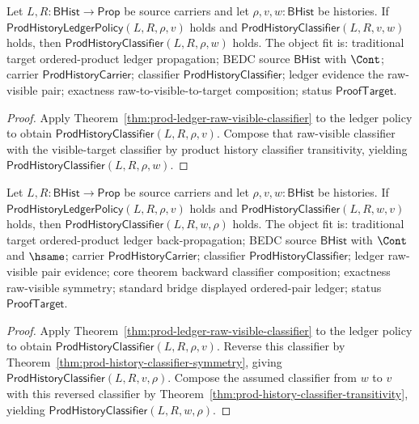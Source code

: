 \begin{theorem}
\label{thm:prod-ledger-classifier-extension}
Let $L,R:\mathsf{BHist}\to\mathsf{Prop}$ be source carriers and let
$\rho,v,w:\mathsf{BHist}$ be histories. If
$\mathsf{ProdHistoryLedgerPolicy}(L,R,\rho,v)$ holds and
$\mathsf{ProdHistoryClassifier}(L,R,v,w)$ holds, then
$\mathsf{ProdHistoryClassifier}(L,R,\rho,w)$ holds. The object fit is:
traditional target ordered-product ledger propagation; BEDC source
$\mathsf{BHist}$ with $\Cont$; carrier $\mathsf{ProdHistoryCarrier}$;
classifier $\mathsf{ProdHistoryClassifier}$; ledger evidence the raw-visible
pair; exactness raw-to-visible-to-target composition; status
$\mathsf{ProofTarget}$.
\end{theorem}
\begin{proof}
Apply Theorem~\ref{thm:prod-ledger-raw-visible-classifier} to the ledger
policy to obtain $\mathsf{ProdHistoryClassifier}(L,R,\rho,v)$. Compose that
raw-visible classifier with the visible-target classifier by product history
classifier transitivity, yielding
$\mathsf{ProdHistoryClassifier}(L,R,\rho,w)$.
\end{proof}

\begin{theorem}
\label{thm:prod-ledger-classifier-backward-composition}
Let $L,R:\mathsf{BHist}\to\mathsf{Prop}$ be source carriers and let
$\rho,v,w:\mathsf{BHist}$ be histories. If
$\mathsf{ProdHistoryLedgerPolicy}(L,R,\rho,v)$ holds and
$\mathsf{ProdHistoryClassifier}(L,R,w,v)$ holds, then
$\mathsf{ProdHistoryClassifier}(L,R,w,\rho)$ holds. The object fit is:
traditional target ordered-product ledger back-propagation; BEDC source
$\mathsf{BHist}$ with $\Cont$ and $\hsame$; carrier
$\mathsf{ProdHistoryCarrier}$; classifier $\mathsf{ProdHistoryClassifier}$;
ledger raw-visible pair evidence; core theorem backward classifier
composition; exactness raw-visible symmetry; standard bridge displayed
ordered-pair ledger; status $\mathsf{ProofTarget}$.
\end{theorem}
\begin{proof}
Apply Theorem~\ref{thm:prod-ledger-raw-visible-classifier} to the ledger
policy to obtain $\mathsf{ProdHistoryClassifier}(L,R,\rho,v)$. Reverse this
classifier by Theorem~\ref{thm:prod-history-classifier-symmetry}, giving
$\mathsf{ProdHistoryClassifier}(L,R,v,\rho)$. Compose the assumed classifier
from $w$ to $v$ with this reversed classifier by
Theorem~\ref{thm:prod-history-classifier-transitivity}, yielding
$\mathsf{ProdHistoryClassifier}(L,R,w,\rho)$.
\end{proof}

